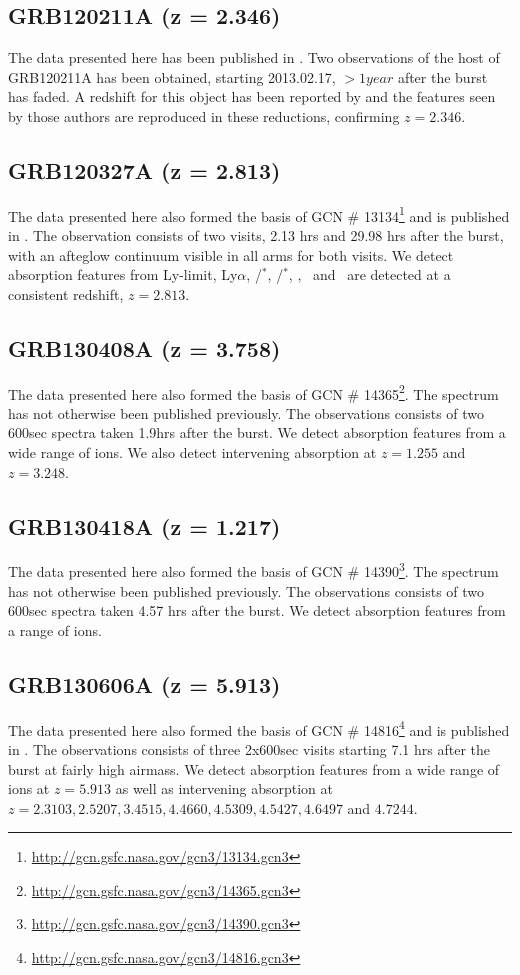 \documentclass[iop, twocolappendix, numberedappendix, tighten, appendixfloats]{emulateapj}
\newcommand{\lya}{Ly$\alpha$}
\newcommand{\feii}{\ion{Fe}{2}}
\newcommand{\cii}{\ion{C}{2}}
\newcommand{\mgii}{\ion{Mg}{2}}
\newcommand{\ali}{\ion{Al}{1}}
\newcommand{\SIii}{\ion{Si}{2}}
\begin{document}
	\subsection{GRB120211A (z =	2.346)}
	The data presented here has been published in \citet{Kruhler2015}. Two
	observations of the host of GRB120211A has been obtained, starting 2013.02.17,
	$> 1 year$ after the burst has faded. A redshift for this object has been
	reported by \citet{Kruhler2015} and the features seen by those authors are
	reproduced in these reductions, confirming $z =	2.346$.
	
	\subsection{GRB120327A (z = 2.813)}
	The data presented here also formed the basis of GCN \#
	13134\footnote{\url{http://gcn.gsfc.nasa.gov/gcn3/13134.gcn3}} and is published
	in \citet{DElia2014}. The observation consists of two visits, 2.13 hrs and
	29.98 hrs after the burst, with an afteglow continuum visible in all arms for
	both visits. We detect absorption features from Ly-limit, \lya, \cii/\cii$^*$,
	\SIii/\SIii$^*$, \ali, \feii ~and \mgii ~are detected at a consistent redshift,
	$z = 2.813$.

    \subsection{GRB130408A (z = 3.758)}
	The data presented here also formed the basis of GCN \#
	14365\footnote{\url{http://gcn.gsfc.nasa.gov/gcn3/14365.gcn3}}. The spectrum
	has not otherwise been published previously. The observations consists of two
	600sec spectra taken 1.9hrs after the burst. We detect absorption features from
	a wide range of ions. We also detect intervening absorption at $z=1.255$ and
	$z=3.248$.
	
	\subsection{GRB130418A (z = 1.217)}
	The data presented here also formed the basis of GCN \#
	14390\footnote{\url{http://gcn.gsfc.nasa.gov/gcn3/14390.gcn3}}. The spectrum
	has not otherwise been published previously. The observations consists of two
	600sec spectra taken 4.57 hrs after the burst. We detect absorption features from
	a range of ions. 
	
	\subsection{GRB130606A (z = 5.913)}
	The data presented here also formed the basis of GCN \#
	14816\footnote{\url{http://gcn.gsfc.nasa.gov/gcn3/14816.gcn3}} and is published
	in \citet{Hartoog2015}. The observations consists of three 2x600sec visits
	starting 7.1 hrs after the burst at fairly high airmass. We detect absorption
	features from a wide range of ions at $z=5.913$ as well as intervening
	absorption at $z=2.3103, 2.5207, 3.4515, 4.4660, 4.5309, 4.5427, 4.6497 $ and $
	4.7244$.
\end{document}
